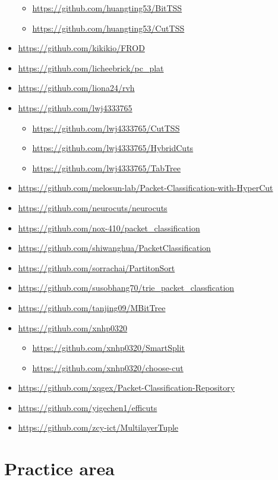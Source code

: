\documentclass[acmsmall]{acmart}
\begin{document}
\begin{itemize}
  \begin{itemize}
  \item \url{https://github.com/huangting53/BitTSS}
  \item \url{https://github.com/huangting53/CutTSS}
  \end{itemize}
\item \url{https://github.com/kikikio/FROD}
\item \url{https://github.com/licheebrick/pc_plat}
\item \url{https://github.com/liona24/rvh}
\item \url{https://github.com/lwj4333765}
  \begin{itemize}
  \item \url{https://github.com/lwj4333765/CutTSS}
  \item \url{https://github.com/lwj4333765/HybridCuts}
  \item \url{https://github.com/lwj4333765/TabTree}
  \end{itemize}
\item \url{https://github.com/melosun-lab/Packet-Classification-with-HyperCut}
\item \url{https://github.com/neurocuts/neurocuts}
\item \url{https://github.com/nox-410/packet_classification}
\item \url{https://github.com/shiwanghua/PacketClassification}
\item \url{https://github.com/sorrachai/PartitonSort}
\item \url{https://github.com/susobhang70/trie_packet_classfication}
\item \url{https://github.com/tanjing09/MBitTree}
\item \url{https://github.com/xnhp0320}
  \begin{itemize}
  \item \url{https://github.com/xnhp0320/SmartSplit}
  \item \url{https://github.com/xnhp0320/choose-cut}
  \end{itemize}
\item \url{https://github.com/xqgex/Packet-Classification-Repository}
\item \url{https://github.com/yigechen1/efficuts}
\item \url{https://github.com/zcy-ict/MultilayerTuple}
\end{itemize}


\section{Practice area}
\end{document}
